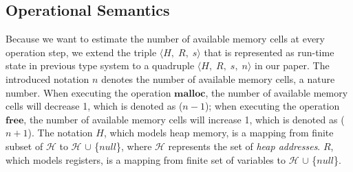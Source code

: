 \documentclass[english]{jssst_ppl} %
\newcommand\coma{,\;}
\newcommand\Malloc{\mathbf{malloc}}
\newcommand\Free{\mathbf{free}}
\theoremstyle{definition}
\begin{document}
\subsection{Operational Semantics}
Because we want to estimate the number of available memory cells at every operation step, we extend the triple $\langle H\coma R\coma s \rangle$ that is represented as run-time state in previous type system to a quadruple $\langle H\coma R\coma s\coma n \rangle$ in our paper. The introduced notation $n$ denotes the number of available memory cells, a nature number. When executing the operation $\Malloc$, the number of available memory cells will decrease 1, which is denoted as ($n - 1$); when executing the operation $\Free$, the number of available memory cells will increase 1, which is denoted as ($n + 1$). The notation $H$, which models heap memory, is a mapping from finite subset of $\mathcal{H}$ to $\mathcal{H}$ $\cup$ \{$null$\}, where $\mathcal{H}$ represents the set of \emph{heap addresses}. $R$, which models registers, is a mapping from finite set of variables to $\mathcal{H}$ $\cup$ \{$null$\}.
\end{document}
